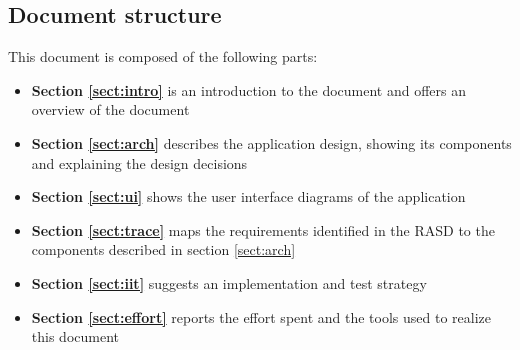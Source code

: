 \subsection{Document structure}
This document is composed of the following parts:
\begin{itemize}[itemsep=-1mm, topsep=-1mm]
	\item \textbf{Section \ref{sect:intro}} is an introduction to the document and offers an overview of the document
	\item \textbf{Section \ref{sect:arch}} describes the application design, showing its components and explaining the design decisions
	\item \textbf{Section \ref{sect:ui}} shows the user interface diagrams of the application
	\item \textbf{Section \ref{sect:trace}} maps the requirements identified in the RASD to the components described in section \ref{sect:arch}
	\item \textbf{Section \ref{sect:iit}} suggests an implementation and test strategy 
	\item \textbf{Section \ref{sect:effort}} reports the effort spent and the tools used to realize this document	
\end{itemize}